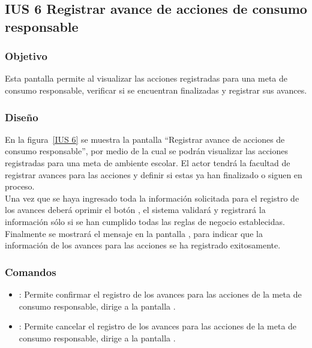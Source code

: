 \subsection{IUS 6 Registrar avance de acciones de consumo responsable}

\subsubsection{Objetivo}

Esta pantalla permite al  visualizar las acciones registradas para una meta de consumo responsable, verificar si se encuentran finalizadas y registrar sus avances. 
    
\subsubsection{Diseño}

    En la figura~\ref{IUS 6} se muestra la pantalla ``Registrar avance de acciones de consumo responsable'', por medio de la cual se podrán visualizar las acciones registradas para una meta de ambiente escolar. El actor tendrá la facultad de registrar avances para las acciones y definir si estas ya han finalizado o siguen en proceso.\\
        
    Una vez que se haya ingresado toda la información solicitada para el registro de los avances deberá oprimir el botón , el sistema validará y registrará la información sólo si se han cumplido todas las reglas de negocio establecidas.\\
    
    Finalmente se mostrará el mensaje  en la pantalla , para indicar que la información de los avances para las acciones se ha registrado exitosamente.
        


\subsubsection{Comandos}
    \begin{itemize} 
    \item {}: Permite confirmar el registro de los avances para las acciones de la meta de consumo responsable, dirige a la pantalla .
    \item {}: Permite cancelar el registro de los avances para las acciones de la meta de consumo responsable, dirige a la pantalla .
    \end{itemize}

